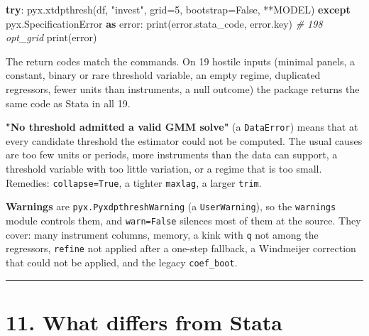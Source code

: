 \documentclass[
  10.5pt,
  a4paper,
]{article}
\newenvironment{Shaded}{}{}
\newcommand{\BuiltInTok}[1]{\textcolor[rgb]{0.00,0.50,0.00}{#1}}
\newcommand{\CommentTok}[1]{\textcolor[rgb]{0.38,0.63,0.69}{\textit{#1}}}
\newcommand{\ControlFlowTok}[1]{\textcolor[rgb]{0.00,0.44,0.13}{\textbf{#1}}}
\newcommand{\DecValTok}[1]{\textcolor[rgb]{0.25,0.63,0.44}{#1}}
\newcommand{\ImportTok}[1]{\textcolor[rgb]{0.00,0.50,0.00}{\textbf{#1}}}
\newcommand{\NormalTok}[1]{#1}
\newcommand{\OperatorTok}[1]{\textcolor[rgb]{0.40,0.40,0.40}{#1}}
\newcommand{\StringTok}[1]{\textcolor[rgb]{0.25,0.44,0.63}{#1}}
\newcommand{\VariableTok}[1]{\textcolor[rgb]{0.10,0.09,0.49}{#1}}
\begin{document}
\begin{Shaded}
\begin{Highlighting}[]
\ControlFlowTok{try}\NormalTok{:}
\NormalTok{    pyx.xtdpthresh(df, }\StringTok{"invest"}\NormalTok{, grid}\OperatorTok{=}\DecValTok{5}\NormalTok{, bootstrap}\OperatorTok{=}\VariableTok{False}\NormalTok{, }\OperatorTok{**}\NormalTok{MODEL)}
\ControlFlowTok{except}\NormalTok{ pyx.SpecificationError }\ImportTok{as}\NormalTok{ error:}
    \BuiltInTok{print}\NormalTok{(error.stata\_code, error.key)  }\CommentTok{\# 198 opt\_grid}
    \BuiltInTok{print}\NormalTok{(error)}
\end{Highlighting}
\end{Shaded}

The return codes match the command\textquotesingle s. On 19 hostile
inputs (minimal panels, a constant, binary or rare threshold variable,
an empty regime, duplicated regressors, fewer units than instruments, a
null outcome) the package returns the same code as Stata in all 19.

\textbf{"No threshold admitted a valid GMM solve"} (a
\texttt{DataError}) means that at every candidate threshold the
estimator could not be computed. The usual causes are too few units or
periods, more instruments than the data can support, a threshold
variable with too little variation, or a regime that is too small.
Remedies: \texttt{collapse=True}, a tighter \texttt{maxlag}, a larger
\texttt{trim}.

\textbf{Warnings} are \texttt{pyx.PyxdpthreshWarning} (a
\texttt{UserWarning}), so the \texttt{warnings} module controls them,
and \texttt{warn=False} silences most of them at the source. They cover:
many instrument columns, memory, a kink with \texttt{q} not among the
regressors, \texttt{refine} not applied after a one-step fallback, a
Windmeijer correction that could not be applied, and the legacy
\texttt{coef\_boot}.

\begin{center}\rule{0.5\linewidth}{0.5pt}\end{center}

\section{11. What differs from Stata}\label{what-differs-from-stata}
\end{document}
